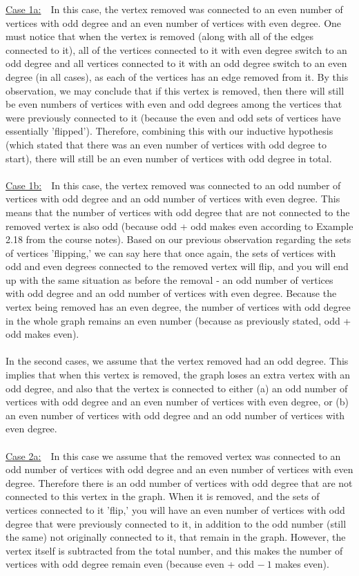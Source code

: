 \documentclass{article}
\begin{document}
\begin{enumerate}
	\underline{Case 1a:}\ \ In this case, the vertex removed was connected to an even number of vertices with odd degree and an even number of vertices with even degree. One must notice that when the vertex is removed (along with all of the edges connected to it), all of the vertices connected to it with even degree switch to an odd degree and all vertices connected to it with an odd degree switch to an even degree (in all cases), as each of the vertices has an edge removed from it. By this observation, we may conclude that if this vertex is removed, then there will still be even numbers of vertices with even and odd degrees among the vertices that were previously connected to it (because the even and odd sets of vertices have essentially 'flipped'). Therefore, combining this with our inductive hypothesis (which stated that there was an even number of vertices with odd degree to start), there will still be an even number of vertices with odd degree in total. \\\\
	\underline{Case 1b:}\ \ In this case, the vertex removed was connected to an odd number of vertices with odd degree and an odd number of vertices with even degree. This means that the number of vertices with odd degree that are not connected to the removed vertex is also odd (because odd + odd makes even according to Example 2.18 from the course notes). Based on our previous observation regarding the sets of vertices 'flipping,' we can say here that once again, the sets of vertices with odd and even degrees connected to the removed vertex will flip, and you will end up with the same situation as before the removal - an odd number of vertices with odd degree and an odd number of vertices with even degree. Because the vertex being removed has an even degree, the number of vertices with odd degree in the whole graph remains an even number (because as previously stated, odd + odd makes even). \\\\
	In the second cases, we assume that the vertex removed had an odd degree. This implies that when this vertex is removed, the graph loses an extra vertex with an odd degree, and also that the vertex is connected to either (a) an odd number of vertices with odd degree and an even number of vertices with even degree, or (b) an even number of vertices with odd degree and an odd number of vertices with even degree. \\\\
	\underline{Case 2a:}\ \ In this case we assume that the removed vertex was connected to an odd number of vertices with odd degree and an even number of vertices with even degree. Therefore there is an odd number of vertices with odd degree that are not connected to this vertex in the graph. When it is removed, and the sets of vertices connected to it 'flip,' you will have an even number of vertices with odd degree that were previously connected to it, in addition to the odd number (still the same) not originally connected to it, that remain in the graph. However, the vertex itself is subtracted from the total number, and this makes the number of vertices with odd degree remain even (because even + odd $-\ 1$ makes even). \\\\

\end{enumerate}
\end{document}
